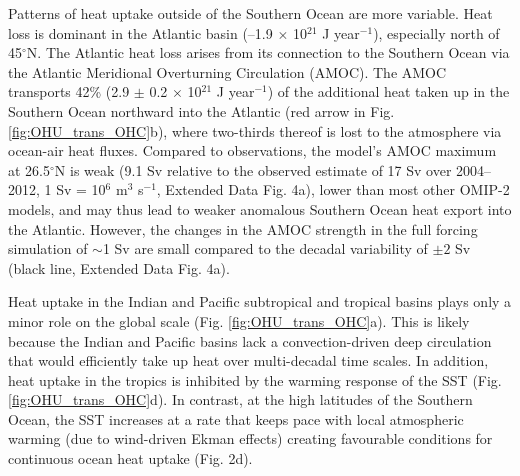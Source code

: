 \documentclass{nature}
\begin{document}
	Patterns of heat uptake outside of the Southern Ocean are more variable. Heat loss is dominant in the Atlantic basin (--1.9 $\times$ 10$^{21}$ J year$^{-1}$), especially north of 45$^{\circ}$N. The Atlantic heat loss arises from its connection to the Southern Ocean via the Atlantic Meridional Overturning Circulation (AMOC). The AMOC transports 42\% (2.9 $\pm$ 0.2 $\times$ 10$^{21}$ J year$^{-1}$) of the additional heat taken up in the Southern Ocean northward into the Atlantic (red arrow in Fig. \ref{fig:OHU_trans_OHC}b), where two-thirds thereof is lost to the atmosphere via ocean-air heat fluxes. Compared to observations, the model's AMOC maximum at 26.5$^{\circ}$N is weak (9.1 Sv relative to the observed estimate of 17 Sv over 2004--2012\cite{mccarthy2015AMOC}, 1 Sv = 10$^{6}$ m$^{3}$ s$^{-1}$, Extended Data Fig. 4a), lower than most other OMIP-2 models\cite{tsujino2020omip}, and may thus lead to weaker anomalous Southern Ocean heat export into the Atlantic. However, the changes in the AMOC strength in the full forcing simulation of $\sim$1 Sv are small compared to the decadal variability of $\pm 2$ Sv (black line, Extended Data Fig. 4a). 
	
	Heat uptake in the Indian and Pacific subtropical and tropical basins plays only a minor role on the global scale (Fig. \ref{fig:OHU_trans_OHC}a). This is likely because the Indian and Pacific basins lack a convection-driven deep circulation\cite{godfrey2001tropical,talley2011descriptive} that would efficiently take up heat over multi-decadal time scales. In addition, heat uptake in the tropics is inhibited by the warming response of the SST (Fig. \ref{fig:OHU_trans_OHC}d).  In contrast, at the high latitudes of the Southern Ocean, the SST increases at a rate that keeps pace with local atmospheric warming (due to wind-driven Ekman effects) creating favourable conditions for continuous ocean heat uptake (Fig. 2d). 
	
\end{document}
